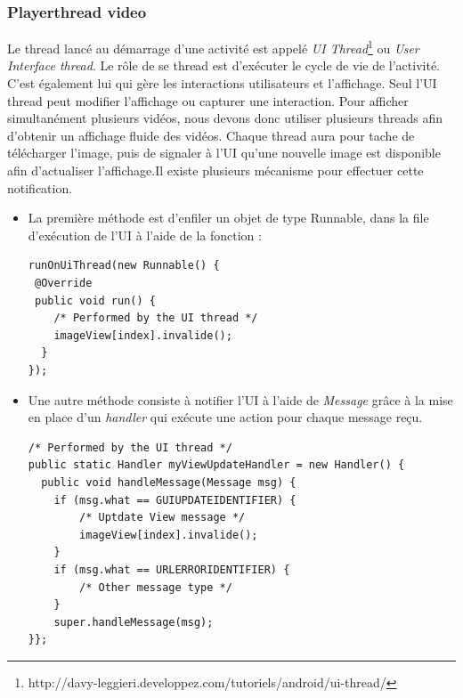 \subsubsection{Playerthread video}
Le thread lancé au démarrage d'une activité est appelé \textit{UI Thread}\footnote{\label{UIThread}
http://davy-leggieri.developpez.com/tutoriels/android/ui-thread/} ou
\textit{User Interface thread}. Le rôle de se thread est d'exécuter le cycle de
vie de l'activité. C'est également lui qui gère les interactions
utilisateurs et l'affichage. Seul l'UI thread peut modifier l'affichage
ou capturer une interaction.\newline 
\indent Pour afficher simultanément plusieurs vidéos, nous devons donc utiliser
plusieurs threads afin d'obtenir un affichage fluide des vidéos.\newline
Chaque thread aura pour tache de télécharger l'image, puis de signaler à l'UI
qu'une nouvelle image est disponible afin d'actualiser
l'affichage.\newline\newline\indent Il existe plusieurs mécanisme pour effectuer
cette notification.\newline
\begin{itemize}
  \item La première méthode est d'enfiler un objet de type
  Runnable, dans la file d'exécution de l'UI à l'aide de la
  fonction : \newline
  \begin{lstlisting}[caption={Example of use runOnUiThread}]
 runOnUiThread(new Runnable() {
 @Override
 public void run() {
	/* Performed by the UI thread */
	imageView[index].invalide();
  }
});  
  \end{lstlisting}
\item Une autre méthode consiste à notifier l'UI à l'aide de
\textit{Message} grâce à la mise en place d'un \textit{handler} qui
exécute une action pour chaque message reçu.\newline
\begin{lstlisting}[caption={Example of message handler}] 
/* Performed by the UI thread */
public static Handler myViewUpdateHandler = new Handler() {
  public void handleMessage(Message msg) {
	if (msg.what == GUIUPDATEIDENTIFIER) {
		/* Uptdate View message */
		imageView[index].invalide();
	}
	if (msg.what == URLERRORIDENTIFIER) {
		/* Other message type */
	}
	super.handleMessage(msg);
}};    
\end{lstlisting}    
\end{itemize}
